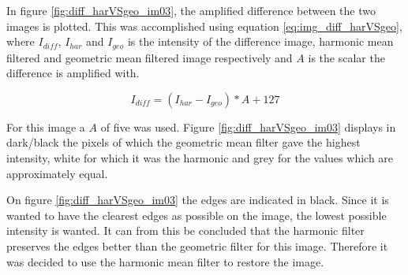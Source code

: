 In figure \ref{fig:diff_harVSgeo_im03}, the amplified difference between the two images is plotted.
This was accomplished using equation \ref{eq:img_diff_harVSgeo}, where $I_{diff}$, $I_{har}$ and $I_{geo}$ is the intensity of the difference image, harmonic mean filtered and geometric mean filtered image respectively and $A$ is the scalar the difference is amplified with.

\begin{equation}
I_{diff} = \left( I_{har} - I_{geo} \right) * A + 127
\label{eq:img_diff_harVSgeo}
\end{equation}

For this image a $A$ of five was used.
Figure \ref{fig:diff_harVSgeo_im03} displays in dark/black the pixels of which the geometric mean filter gave the highest intensity, white for which it was the harmonic and grey for the values which are approximately equal.

On figure \ref{fig:diff_harVSgeo_im03} the edges are indicated in black.
Since it is wanted to have the clearest edges as possible on the image, the lowest possible intensity is wanted.
It can from this be concluded that the harmonic filter preserves the edges better than the geometric filter for this image.
Therefore it was decided to use the harmonic mean filter to restore the image.


